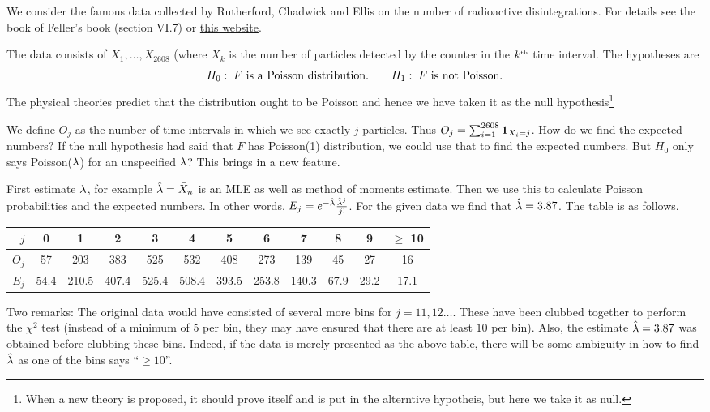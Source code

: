 \documentclass[preprint,  11pt]{amsart}
\begin{document}
 We consider the famous data collected by Rutherford, Chadwick and Ellis on the number of radioactive disintegrations. For details see the book of Feller's book (section VI.7) or \href{http://galton.uchicago.edu/~lalley/Courses/312/PoissonProcesses.pdf}{this website}.

The data consists of $X_{1},\ldots ,X_{2608}$ (where $X_{k}$ is the number of particles detected by the counter in the $k^{\mbox{\tiny th}}$ time interval. The hypotheses are
 $$
 H_{0}: \; F \mbox{ is a Poisson distribution}. \qquad H_{1}: \; F \mbox{ is not Poisson}.
 $$
The physical theories predict that the distribution ought to be Poisson and hence we have taken it as the null hypothesis\footnote{When a new theory is proposed, it should prove itself and is put in the alterntive hypotheis, but here we take it as null.}

We define $O_{j}$ as the number of time intervals in which we see exactly $j$ particles. Thus $O_{j}=\sum_{i=1}^{2608}{\mathbf 1}_{X_{i}=j}$. How do we find the expected numbers? If the null hypothesis had said that $F$ has Poisson(1) distribution, we could use that to find the expected numbers. But $H_{0}$ only says Poisson($\lambda$) for an unspecified $\lambda$? This brings in a new feature.

First estimate $\lambda$, for example $\hat{\lambda}=\bar{X}_{n}$ is an MLE as well as method of moments estimate. Then we use this to calculate Poisson probabilities and the expected numbers. In other words, $E_{j}=e^{-\hat{\lambda}}\frac{\hat{\lambda}^{j}}{j!}$. For the given data we find that $\hat{\lambda}=3.87$. The table is as follows.

\begin{center}
\begin{tabular}{||r|c|c|c|c|c|c|c|c|c|c|c||}
\hline
$j$  & 0 & 1 & 2 & 3 & 4 & 5 & 6 & 7 & 8 & 9 & $\ge$ 10 \\
\hline
$O_{j}$  & 57 & 203 & 383 & 525 & 532 & 408 & 273 & 139 & 45 & 27 & 16 \\
\hline
$E_{j}$ & 54.4 & 210.5 & 407.4 & 525.4 & 508.4 & 393.5 & 253.8 & 140.3 & 67.9 & 29.2 & 17.1 \\
\hline
\end{tabular}
\end{center}
Two remarks: The original data would have consisted of several more bins for $j=11,12\ldots$. These have been clubbed together to perform the $\chi^{2}$ test (instead of a minimum of $5$ per bin, they may have ensured that there are at least $10$ per bin). Also, the estimate $\hat{\lambda}=3.87$ was obtained before clubbing these bins. Indeed, if the data is merely presented as the above table, there will be some ambiguity in how to find $\hat{\lambda}$ as one of the bins says ``$\ge 10$''.
\end{document}
